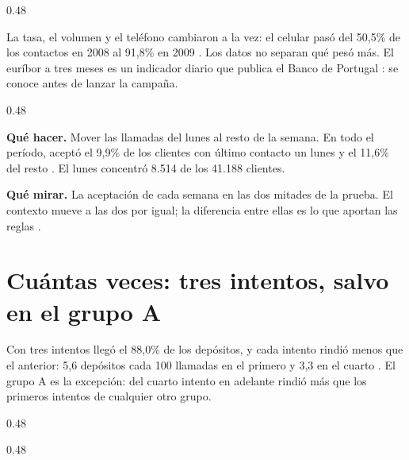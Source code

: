 \documentclass[10pt,a4paper]{article}
\begin{document}
\noindent\begin{columna}{0.48\linewidth}

La tasa, el volumen y el teléfono cambiaron a la vez: el celular pasó del 50,5\% de los
contactos en 2008 al 91,8\% en 2009 . Los datos no separan qué pesó más. El
euríbor a tres meses es un indicador diario que publica el Banco de Portugal :
se conoce antes de lanzar la campaña.
\end{columna}\hfill
\begin{columna}{0.48\linewidth}

\textbf{Qué hacer.} Mover las llamadas del lunes al resto de la semana. En todo el período,
aceptó el 9,9\% de los clientes con último contacto un lunes y el 11,6\% del resto
. El lunes concentró 8.514 de los 41.188 clientes.

\textbf{Qué mirar.} La aceptación de cada semana en las dos mitades de la prueba. El
contexto mueve a las dos por igual; la diferencia entre ellas es lo que aportan las reglas
.
\end{columna}

\newpage
\section{Cuántas veces: tres intentos, salvo en el grupo A}\label{sec:veces}

Con tres intentos llegó el 88,0\% de los depósitos, y cada intento rindió menos que el
anterior: 5,6 depósitos cada 100 llamadas en el primero y 3,3 en el cuarto . El
grupo A es la excepción: del cuarto intento en adelante rindió más que los primeros
intentos de cualquier otro grupo.


\noindent\begin{columna}{0.48\linewidth}
\end{columna}\hfill
\begin{columna}{0.48\linewidth}
\end{columna}
\end{document}
